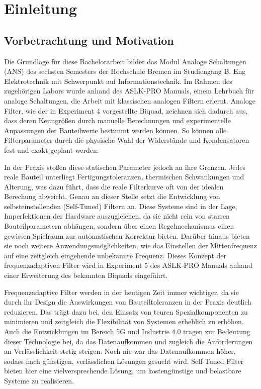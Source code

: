 %

\chapter{Einleitung}


\section{Vorbetrachtung und Motivation}
Die Grundlage für diese Bachelorarbeit bildet das Modul Analoge Schaltungen (ANS) des sechsten Semesters der Hochschule Bremen im Studiengang B. Eng Elektrotechnik mit Schwerpunkt auf Informationstechnik. Im Rahmen des zugehörigen Labors wurde anhand des ASLK-PRO Manuals, einem Lehrbuch für analoge Schaltungen, die Arbeit mit klassischen analogen Filtern erlernt. Analoge Filter, wie der in Experiment 4 vorgestellte Biquad, zeichnen sich dadurch aus, dass deren Kenngrößen durch manuelle Berechnungen und experimentelle Anpassungen der Bauteilwerte bestimmt werden können. So können alle Filterparameter durch die physische Wahl der Widerstände und Kondensatoren fest und exakt geplant werden. \par
\medskip

In der Praxis stoßen diese statischen Parameter jedoch an ihre Grenzen. Jedes reale Bauteil unterliegt Fertigungstoleranzen, thermischen Schwankungen und Alterung, was dazu führt, dass die reale Filterkurve oft von der idealen Berechung abweicht. Genau an dieser Stelle setzt die Entwicklung von selbsteinstellenden (Self-Tuned) Filtern an. Diese Systeme sind in der Lage, Imperfektionen der Hardware auszugleichen, da sie nicht rein von starren Bauteilparametern abhängen, sondern über einen Regelmechanismus einen gewissen Spielraum zur automatischen Korrektur bieten. Darüber hinaus bieten sie noch weitere Anwendungsmöglichkeiten, wie das Einstellen der Mittenfrequenz auf eine zeitgleich eingehende unbekannte Frequenz. Dieses Konzept der frequenzadaptiven Filter wird in Experiment 5 des ASLK-PRO Manuals anhand einer Erweiterung des bekannten Biquads eingeführt. \par
\medskip

Frequenzadaptive Filter werden in der heutigen Zeit immer wichtiger, da sie durch ihr Design die Auswirkungen von Bauteiltoleranzen in der Praxis deutlich reduzieren. Das trägt dazu bei, den Einsatz von teuren Spezialkomponenten zu minimieren und zeitgleich die Flexibilität von Systemen erheblich zu erhöhen. Auch die Entwicklungen im Bereich 5G und Industrie 4.0 tragen zur Bedeutung dieser Technologie bei, da das Datenaufkommen und zugleich die Anforderungen an Verlässlichkeit stetig steigen. Noch nie war das Datenaufkommen höher, sodass nach günstigen, verlässlichen Lösungen gesucht wird. Self-Tuned Filter bieten hier eine vielversprechende Lösung, um kostengünstige und belastbare Systeme zu realisieren.\par
\medskip

